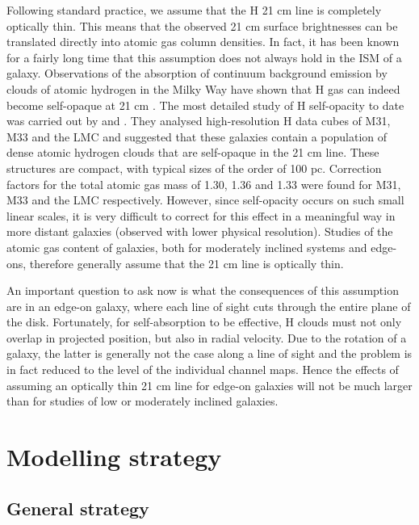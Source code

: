 \documentclass{aa}
\begin{document}
\par
Following standard practice, we assume that the H{} 21 cm line is completely optically thin. This means that the observed 21 cm surface brightnesses can be translated directly into atomic gas column densities. In fact, it has been known for a fairly long time that this assumption does not always hold in the ISM of a galaxy. Observations of the absorption of continuum background emission by clouds of atomic hydrogen in the Milky Way have shown that H{} gas can indeed become self-opaque at 21 cm \citep[e.g.][]{hagen54, radhak60, gibson05}. The most detailed study of H{} self-opacity to date was carried out by \cite{braun09} and \cite{braun12}. They analysed high-resolution H{} data cubes of M31, M33 and the LMC and suggested that these galaxies contain a population of dense atomic hydrogen clouds that are self-opaque in the 21 cm line. These structures are compact, with typical sizes of the order of 100 pc. Correction factors for the total atomic gas mass of 1.30, 1.36 and 1.33 were found for M31, M33 and the LMC respectively. However, since self-opacity occurs on such small linear scales, it is very difficult to correct for this effect in a meaningful way in more distant galaxies (observed with lower physical resolution). Studies of the atomic gas content of galaxies, both for moderately inclined systems and edge-ons, therefore generally assume that the 21 cm line is optically thin.
\par
An important question to ask now is what the consequences of this assumption are in an edge-on galaxy, where each line of sight cuts through the entire plane of the disk. Fortunately, for self-absorption to be effective, H{} clouds must not only overlap in projected position, but also in radial velocity. Due to the rotation of a galaxy, the latter is generally not the case along a line of sight and the problem is in fact reduced to the level of the individual channel maps. Hence the effects of assuming an optically thin 21 cm line for edge-on galaxies will not be much larger than for studies of low or moderately inclined galaxies.


\section{Modelling strategy}
\label{sec:strategy}

\subsection{General strategy}
\end{document}
